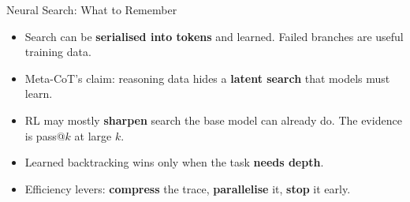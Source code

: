 \begin{frame}{Neural Search: What to Remember}
    \begin{itemize}\itemsep0.6em
        \item Search can be \textbf{serialised into tokens} and learned. Failed branches are useful training data.
        \item Meta-CoT's claim: reasoning data hides a \textbf{latent search} that models must learn.
        \item RL may mostly \textbf{sharpen} search the base model can already do. The evidence is pass@$k$ at large $k$.
        \item Learned backtracking wins only when the task \textbf{needs depth}.
        \item Efficiency levers: \textbf{compress} the trace, \textbf{parallelise} it, \textbf{stop} it early.
    \end{itemize}
    \vspace{0.3em}
    \vspace{0.2em}
\end{frame}

